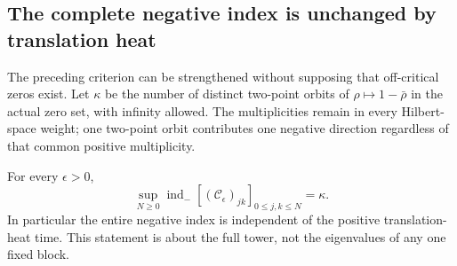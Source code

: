 \subsection{The complete negative index is unchanged by translation heat}
The preceding criterion can be strengthened without supposing that off-critical zeros exist. Let $\kappa$ be the number of distinct two-point orbits of $\rho\mapsto1-\bar\rho$ in the actual zero set, with infinity allowed. The multiplicities remain in every Hilbert-space weight; one two-point orbit contributes one negative direction regardless of that common positive multiplicity.

\begin{theorem}
For every $\epsilon>0$,
\begin{equation}
 \boxed{\sup_{N\ge0}\operatorname{ind}_{-}
       [ (\mathcal C_\epsilon)_{jk}]_{0\le j,k\le N}=\kappa.}
                                                               \tag{PWG24}\label{PWG24}
\end{equation}
In particular the entire negative index is independent of the positive translation-heat time. This statement is about the full tower, not the eigenvalues of any one fixed block.
\end{theorem}
